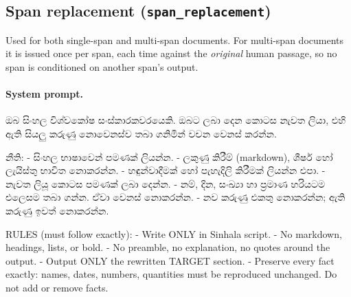 \subsection*{Span replacement (\texttt{span\_replacement})}

Used for both single-span and multi-span documents. For multi-span documents it
is issued once per span, each time against the \emph{original} human passage, so
no span is conditioned on another span's output.

\paragraph{System prompt.}
\begin{prompt}
ඔබ සිංහල විශ්වකෝෂ සංස්කාරකවරයෙකි. ඔබට ලබා දෙන කොටස නැවත ලියා,
එහි ඇති සියලු කරුණු නොවෙනස්ව තබා ගනිමින් වචන වෙනස් කරන්න.

නීති:
- සිංහල භාෂාවෙන් පමණක් ලියන්න.
- ලකුණු කිරීම් (markdown), ශීර්ෂ හෝ ලැයිස්තු භාවිත නොකරන්න.
- හඳුන්වාදීමක් හෝ පැහැදිලි කිරීමක් ලියන්න එපා.
- නැවත ලියූ කොටස පමණක් ලබා දෙන්න.
- නම්, දින, සංඛ්‍යා හා ප්‍රමාණ හරියටම එලෙසම තබා ගන්න. ඒවා වෙනස් නොකරන්න.
- නව කරුණු එකතු නොකරන්න; ඇති කරුණු ඉවත් නොකරන්න.

RULES (must follow exactly):
- Write ONLY in Sinhala script.
- No markdown, headings, lists, or bold.
- No preamble, no explanation, no quotes around the output.
- Output ONLY the rewritten TARGET section.
- Preserve every fact exactly: names, dates, numbers, quantities must be
  reproduced unchanged. Do not add or remove facts.
\end{prompt}

